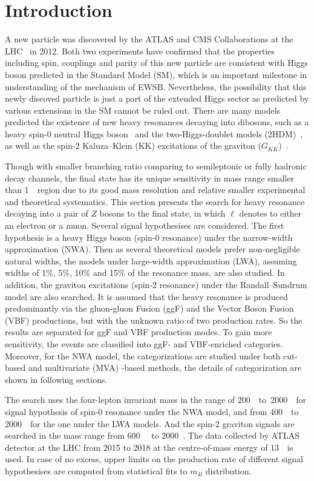\section{Introduction}

A new particle was discovered by the ATLAS and CMS Collaborations at the LHC~\cite{20121, 201230} in 2012.
Both two experiments have confirmed that the properties including spin, couplings and parity of this new particle are consistent with 
Higgs boson predicted in the Standard Model (SM), which is an important milestone in understanding of the mechanism of EWSB.
Nevertheless, the possibility that this newly discoved particle is just a part of the extended Higgs sector
as predicted by various extensions in the SM cannot be ruled out.
There are many models predicted the existence of new heavy resonances decaying into dibosons, 
such as a heavy spin-0 neutral Higgs boson~\cite{PhysRevD.36.3463}
and the two-Higgs-doublet models (2HDM)~\cite{BRANCO20121}, 
as well as the spin-2 Kaluza–Klein (KK) excitations of the graviton ($G_{KK}$)~\cite{DAVOUDIASL200043}.

Though with smaller branching ratio comparing to semileptonic or fully hadronic decay channels, the \llll final state has its unique sensitivity in mass range smaller than 1~\tev~region 
due to its good mass resolution and relative smaller experimental and theoretical systematics.
This section presents the search for heavy resonance decaying into a pair of $Z$ bosons to the \llll final state, in which $\ell$ denotes to either an electron or a muon. 
Several signal hypothesises are considered.
The first hypothesis is a heavy Higgs boson (spin-0 resonance) under the narrow-width approximation (NWA).
Then as several theoretical models prefer non-negligible natural widths, the models under large-width approximation (LWA), 
assuming widths of 1\%, 5\%, 10\% and 15\% of the resonance mass, are also studied.
In addition, the graviton excitations (spin-2 resonance) under the Randall–Sundrum model are also searched.
It is assumed that the heavy resonance is produced predominantly via the gluon-gluon Fusion (ggF) and the Vector Boson Fusion (VBF) productions, 
but with the unknown ratio of two production rates.
So the results are separated for ggF and VBF production modes.
To gain more sensitivity, the \llll events are classified into  ggF- and VBF-enriched categories.
Moreover, for the NWA model, the categorizations are studied under both cut-based and multivariate (MVA) -based methods, the details of categorization are shown in following sections.

The search uses the four-lepton invariant mass in the range of 200~\gev~to~2000~\gev~for signal hypothesis of spin-0 resonance under the NWA model,
and from 400~\gev~to 2000~\gev~for the one under the LWA models.
And the spin-2 graviton signals are searched in the mass range from 600~\gev~ to 2000~\gev.
The data collected by ATLAS detector at the LHC from 2015 to 2018 at the centre-of-mass energy of 13~\tev~is used.
In case of no excess, upper limits on the production rate of different signal hypothesises are computed from statistical fits to $m_{4l}$ distribution.


